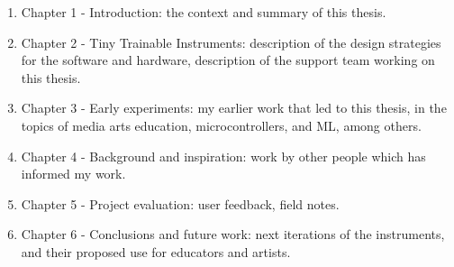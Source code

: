 \begin{enumerate}
  \item Chapter 1 - Introduction: the context and summary of this thesis.
  \item Chapter 2 - Tiny Trainable Instruments: description of the design strategies for the software and hardware, description of the support team working on this thesis.
  \item Chapter 3 - Early experiments: my earlier work that led to this thesis, in the topics of media arts education, microcontrollers, and \acrshort{ML}, among others.
  \item Chapter 4 - Background and inspiration: work by other people which has informed my work.
  \item Chapter 5 - Project evaluation: user feedback, field notes.
  \item Chapter 6 - Conclusions and future work: next iterations of the instruments, and their proposed use for educators and artists.
  \end{enumerate}

